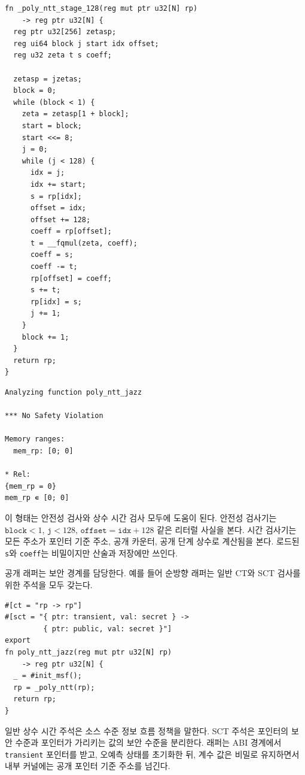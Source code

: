 \documentclass[10pt,twocolumn]{article}
\newcommand{\ct}{상수 시간}
\begin{document}
\begin{lstlisting}[language=Jasmin,caption={단계 특수화된 순방향 보조 함수.},label={lst:ko-stage}]
fn _poly_ntt_stage_128(reg mut ptr u32[N] rp)
    -> reg ptr u32[N] {
  reg ptr u32[256] zetasp;
  reg ui64 block j start idx offset;
  reg u32 zeta t s coeff;

  zetasp = jzetas;
  block = 0;
  while (block < 1) {
    zeta = zetasp[1 + block];
    start = block;
    start <<= 8;
    j = 0;
    while (j < 128) {
      idx = j;
      idx += start;
      s = rp[idx];
      offset = idx;
      offset += 128;
      coeff = rp[offset];
      t = __fqmul(zeta, coeff);
      coeff = s;
      coeff -= t;
      rp[offset] = coeff;
      s += t;
      rp[idx] = s;
      j += 1;
    }
    block += 1;
  }
  return rp;
}
\end{lstlisting}

\begin{lstlisting}[language=Jasmin]
Analyzing function poly_ntt_jazz

*** No Safety Violation

Memory ranges:
  mem_rp: [0; 0]
  
* Rel:
{mem_rp = 0}
mem_rp ∊ [0; 0]

\end{lstlisting}


이 형태는 안전성 검사와 \ct{} 검사 모두에 도움이 된다. 안전성 검사기는
\(\texttt{block}<1\), \(\texttt{j}<128\), \(\texttt{offset}=\texttt{idx}+128\)
같은 리터럴 사실을 본다. 시간 검사기는 모든 주소가 포인터 기준 주소,
공개 카운터, 공개 단계 상수로 계산됨을 본다. 로드된 \texttt{s}와
\texttt{coeff}는 비밀이지만 산술과 저장에만 쓰인다.

공개 래퍼는 보안 경계를 담당한다. 예를 들어 순방향 래퍼는 일반 CT와
SCT 검사를 위한 주석을 모두 갖는다.

\begin{lstlisting}[language=Jasmin,caption={공개 래퍼 주석.},label={lst:ko-wrapper}]
#[ct = "rp -> rp"]
#[sct = "{ ptr: transient, val: secret } ->
         { ptr: public, val: secret }"]
export
fn poly_ntt_jazz(reg mut ptr u32[N] rp)
    -> reg ptr u32[N] {
  _ = #init_msf();
  rp = _poly_ntt(rp);
  return rp;
}
\end{lstlisting}

일반 \ct{} 주석은 소스 수준 정보 흐름 정책을 말한다. SCT 주석은 포인터의
보안 수준과 포인터가 가리키는 값의 보안 수준을 분리한다. 래퍼는 ABI
경계에서 \texttt{transient} 포인터를 받고, 오예측 상태를 초기화한 뒤,
계수 값은 비밀로 유지하면서 내부 커널에는 공개 포인터 기준 주소를 넘긴다.
\end{document}
